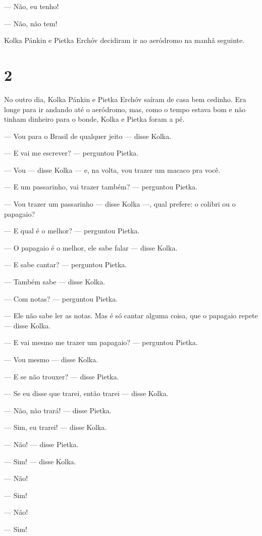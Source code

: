 --- Não, eu tenho!

--- Não, não tem!

Kolka Pánkin e Pietka Erchóv decidiram ir ao aeródromo na manhã
seguinte.

\section{2}

No outro dia, Kolka Pánkin e Pietka Erchóv saíram de casa bem
cedinho. Era longe para ir andando até o aeródromo, mas, como o tempo
estava bom e não tinham dinheiro para o bonde, Kolka e Pietka foram a
pé.

--- Vou para o Brasil de qualquer jeito --- disse Kolka.

--- E vai me escrever? --- perguntou Pietka.

--- Vou --- disse Kolka --- e, na volta, vou trazer um macaco pra você.

--- E um passarinho, vai trazer também? --- perguntou Pietka.

--- Vou trazer um passarinho --- disse Kolka ---, qual prefere: o
colibri ou o papagaio?

--- E qual é o melhor? --- perguntou Pietka.

--- O papagaio é o melhor, ele sabe falar --- disse Kolka.

--- E sabe cantar? --- perguntou Pietka.

--- Também sabe --- disse Kolka.

--- Com notas? --- perguntou Pietka.

--- Ele não sabe ler as notas. Mas é só cantar alguma coisa, que o
papagaio repete --- disse Kolka.

--- E vai mesmo me trazer um papagaio? --- perguntou Pietka.

--- Vou mesmo --- disse Kolka.

--- E se não trouxer? --- disse Pietka.

--- Se eu disse que trarei, então trarei --- disse Kolka.

--- Não, não trará! --- disse Pietka.

--- Sim, eu trarei! --- disse Kolka.

--- Não! --- disse Pietka.

--- Sim! --- disse Kolka.

--- Não!

--- Sim!

--- Não!

--- Sim!

